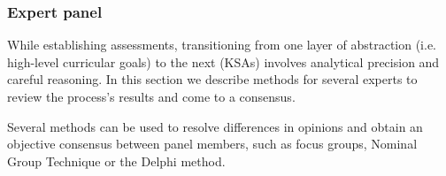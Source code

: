 %
%
%






\subsubsection{Expert panel}\label{sec:ExpertPanel}
While establishing assessments, transitioning from one layer of abstraction (i.e. high-level curricular goals) to the next (KSAs) involves analytical precision and careful reasoning. In this section we describe methods for several experts to review the process's results and come to a consensus.


Several methods can be used to resolve differences in opinions and obtain an objective consensus between panel members, such as focus groups, Nominal Group Technique or the Delphi method.

